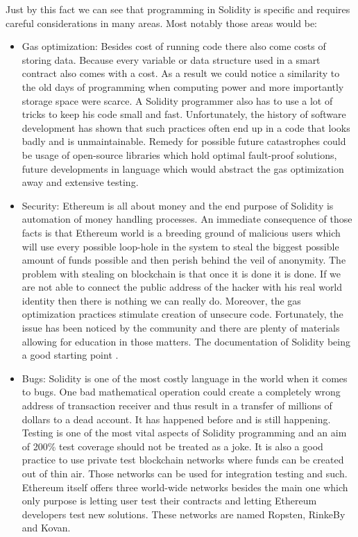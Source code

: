 \documentclass[a4paper,12pt,twoside,openany]{report}
\begin{document}
Just by this fact we can see that programming in Solidity is specific and requires careful considerations in many areas. Most notably those areas would be:
\begin{itemize}
\item Gas optimization: Besides cost of running code there also come costs of storing data. Because every variable or data structure used in a smart contract also comes with a cost. As a result we could notice a similarity to the old days of programming when computing power and more importantly storage space were scarce. A Solidity programmer also has to use a lot of tricks to keep his code small and fast. Unfortunately, the history of software development has shown that such practices often end up in a code that looks badly and is unmaintainable. Remedy for possible future catastrophes could be usage of open-source libraries which hold optimal fault-proof solutions, future developments in language which would abstract the gas optimization away and extensive testing.
\item Security: Ethereum is all about money and the end purpose of Solidity is automation of money handling processes. An immediate consequence of those facts is that Ethereum world is a breeding ground of malicious users which will use every possible loop-hole in the system to steal the biggest possible amount of funds possible and then perish behind the veil of anonymity. The problem with stealing on blockchain is that once it is done it is done. If we are not able to connect the public address of the hacker with his real world identity then there is nothing we can really do. Moreover, the gas optimization practices stimulate creation of unsecure code. Fortunately, the issue has been noticed by the community and there are plenty of materials allowing for education in those matters. The documentation of Solidity being a good starting point \cite{secure}. 
\item Bugs: Solidity is one of the most costly language in the world when it comes to bugs. One bad mathematical operation could create a completely wrong address of transaction receiver and thus result in a transfer of millions of dollars to a dead account. It has happened before and is still happening. Testing is one of the most vital aspects of Solidity programming and an aim of 200\% test coverage should not be treated as a joke. It is also a good practice to use private test blockchain networks where funds can be created out of thin air. Those networks can be used for integration testing and such. Ethereum itself offers three world-wide networks besides the main one which only purpose is letting user test their contracts and letting Ethereum developers test new solutions. These networks are named Ropsten, RinkeBy and Kovan. 
\end{itemize}
\end{document}
